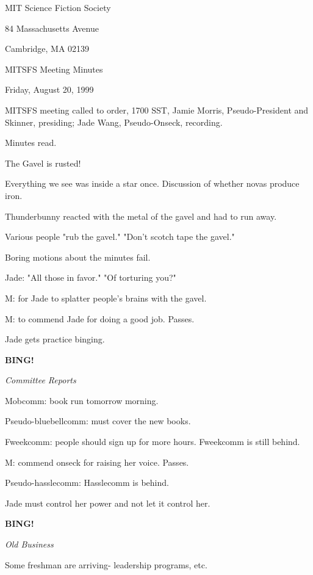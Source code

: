 \documentclass[12pt]{article}
\newcommand{\bing}{{\bf BING!} }
\newcommand{\goto}[1]{\bing \vskip 12pt \centerline{{\em{#1}}}}
\begin{document}
\begin{center}

MIT Science Fiction Society 

84 Massachusetts Avenue

Cambridge, MA 02139

\vspace{12pt}

MITSFS Meeting Minutes 

Friday, August 20, 1999

\end{center}
 
\vspace{18pt}

\setlength{\parskip}{6pt}

\noindent
MITSFS meeting called to order, 1700 SST,
Jamie Morris, Pseudo-President and Skinner, presiding; Jade Wang, Pseudo-Onseck, recording.

Minutes read.

The Gavel is rusted!

Everything we see was inside a star once. Discussion of whether novas produce iron.

Thunderbunny reacted with the metal of the gavel and had to run away.

Various people "rub the gavel." "Don't scotch tape the gavel."

Boring motions about the minutes fail.

Jade: "All those in favor." "Of torturing you?"

M: for Jade to splatter people's brains with the gavel.

M: to commend Jade for doing a good job. Passes.

Jade gets practice binging.

\goto{Committee Reports}

Mobcomm: book run tomorrow morning.

Pseudo-bluebellcomm: must cover the new books.

Fweekcomm: people should sign up for more hours. Fweekcomm is still behind.

M: commend onseck for raising her voice. Passes.

Pseudo-hasslecomm: Hasslecomm is behind.

Jade must control her power and not let it control her.

\goto{Old Business}

Some freshman are arriving- leadership programs, etc.
\end{document}
